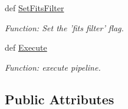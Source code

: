 \begin{DoxyCompactItemize}
def \hyperlink{class_pipeline-0_1_1_pipeline_aab84cef635f2b9ba7ce69d5713e6ce6f}{\-Set\-Fits\-Filter}
\begin{DoxyCompactList}\small\item\em \-Function\-: \-Set the 'fits filter' flag. \end{DoxyCompactList}\item 
def \hyperlink{class_pipeline-0_1_1_pipeline_ad43349c5927428783f0ace239f066830}{\-Execute}
\begin{DoxyCompactList}\small\item\em \-Function\-: execute pipeline. \end{DoxyCompactList}\end{DoxyCompactItemize}
\subsection*{\-Public \-Attributes}
